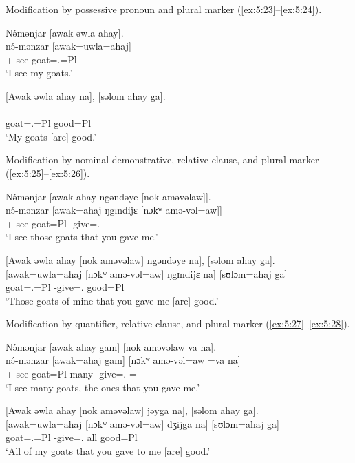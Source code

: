 Modification by possessive pronoun and plural marker (\ref{ex:5:23}--\ref{ex:5:24}). 

\ea \label{ex:5:23}
N\'{ə}mənjar  [awak  əwla  ahay].\\
\gll  n\'{ə}-mənzar  [awak=uwla=ahaj]\\
      {\oneS}+{\IFV}-see  goat={\oneS}.{\POSS}=Pl\\
\glt  ‘I see my goats.’
\z

\ea \label{ex:5:24}
{}[Awak  əwla  ahay  na],  [səlom  ahay  ga].\\
\gll  [awak=uwla=ahaj     na]   [sʊlɔm=ahaj   ga]\\
      goat={\oneS}.{\POSS}=Pl  {\PSP}  good=Pl  {\ADJ}\\
\glt  ‘My goats [are] good.’
\z

Modification by nominal demonstrative, relative clause, and plural marker (\ref{ex:5:25}--\ref{ex:5:26}). 

\ea \label{ex:5:25}
N\'{ə}mənjar  [awak  ahay  ngəndəye  [nok  aməvəlaw]].\\
\gll  n\'{ə}-mənzar  [awak=ahaj  ŋgɪndijɛ  [nɔkʷ  amə-vəl=aw]]\\
      {\oneS}+{\IFV}-see  goat=Pl  {\DEM}  {\twoS}  {\DEP}-give={\oneS}.{\IO}\\
\glt  ‘I see those goats that you gave me.’
\z

\clearpage
\ea \label{ex:5:26}
{}[Awak  əwla  ahay  [nok aməvəlaw]  ngəndəye  na],  [səlom  ahay  ga].\\
\gll  {}[awak=uwla=ahaj   [nɔkʷ   amə-vəl=aw]   ŋgɪndijɛ   na]   [sʊlɔm=ahaj ga]\\ 
      goat={\oneS}.{\POSS}=Pl  {\twoS}  {\DEP}-give={\oneS}.{\IO}  {\DEM}  {\PSP}  good=Pl {\ADJ}\\  
\glt  ‘Those goats of mine that you gave me [are] good.’ 
\z

Modification by quantifier, relative clause, and plural marker (\ref{ex:5:27}--\ref{ex:5:28}). 

\ea \label{ex:5:27}
N\'{ə}mənjar  [awak  ahay  gam]  [nok  aməvəlaw  va  na].\\
\gll  n\'{ə}-mənzar  [awak=ahaj   gam]   [nɔkʷ  amə-vəl=aw   =va   na]\\
      {\oneS}+{\IFV}-see  goat=Pl  many  {\twoS}  {\DEP}-give={\oneS}.{\IO}  ={\PRF}  {\PSP}\\
\glt  ‘I see many goats, the ones that you gave me.’
\z

\ea \label{ex:5:28}
{}[Awak  əwla  ahay  [nok  aməvəlaw]  jəyga  na],  [səlom  ahay  ga].\\
\gll  {}[awak=uwla=ahaj   [nɔkʷ   amə-vəl=aw]   dʒijga   na]   [sʊlɔm=ahaj   ga]\\
      goat={\oneS}.{\POSS}=Pl  {\twoS}  {\DEP}-give={\oneS}.{\IO}  all  {\PSP}  good=Pl  {\ADJ}\\
\glt  ‘All of my goats that you gave to me [are] good.’
\z

